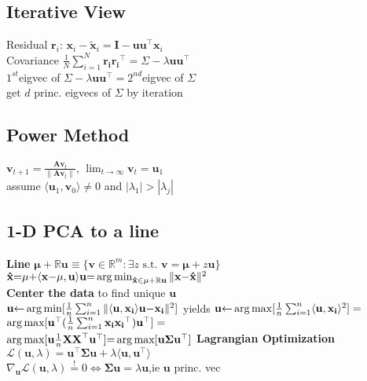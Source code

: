 \subsection*{Iterative View}
Residual $\mathbf{r}_i$: $\mathbf{x}_i{-}\tilde{\mathbf{x}}_i{=}\mathbf{I}{-}\mathbf{uu}^\top \mathbf{x}_i$\\
Covariance  $\frac{1}{N} \sum_{i=1}^N \mathbf{r_i}\mathbf{r_i}^\top{=}\Sigma{-} \lambda \mathbf{uu}^\top$ \\
$1^{st}$eigvec of $\Sigma{-}\lambda \mathbf{u u}^\top{=}2^{nd}$eigvec of $\Sigma$\\
get $d$ princ. eigvecs of $\Sigma$ by iteration
\subsection*{Power Method}
$\mathbf{v}_{t+1}{=}\frac{\mathbf{Av}_t}{\|\mathbf{Av}_t\|}$, $\lim_{t\rightarrow\infty}\mathbf{v}_t=\mathbf{u}_1$\\
assume $\langle\mathbf{u}_1,\mathbf{v}_0\rangle\neq0$ and $|\lambda_1|>|\lambda_j|$
\subsection*{1-D PCA to a line}
\textbf{Line} 
$\mathbf{\mu}{+}\mathbb{R}\mathbf{u}{\equiv}\{\mathbf{v}{\in}\mathbb{R}^m{:}\exists z \text{ s.t. }\mathbf{v}=\mathbf{\mu}+z\mathbf{u}\}$
$\mathbf{\hat{x}}{=}\mathbf{\mu}{+}\langle\mathbf{x}{-}\mathbf{\mu},\mathbf{u}\rangle\mathbf{u}{=}\operatorname*{arg\,min}_{\mathbf{\hat{x}}{\in}\mathbf{\mu}{+}\mathbb{R}\mathbf{u}}\|\mathbf{x}{-}\mathbf{\hat{x}}\|^2$\\
\textbf{Center the data} to find unique $\mathbf{u}$\\
$\mathbf{u}{\leftarrow}\operatorname*{arg\,min}[\frac{1}{n}\sum_{i=1}^n\|\langle\mathbf{u}, \mathbf{x_i}\rangle\mathbf{u}{-}\mathbf{x_i}\|^2]$
yields $\mathbf{u}{\leftarrow}\operatorname*{arg\,max}[\frac{1}{n}\sum_{i=1}^n\langle\mathbf{u},\mathbf{x_i}\rangle^2]=$\\
$\operatorname*{arg\,max}[\mathbf{u}^\top(\frac{1}{n}\sum_{i=1}^n\mathbf{x_ix_i}^\top)\mathbf{u}^\top]=$\\
$\operatorname*{arg\,max}[\mathbf{u}\frac{1}{n}\mathbf{XX}^\top\mathbf{u}^\top] {=} \operatorname*{arg\,max}[\mathbf{u}\mathbf{\Sigma}\mathbf{u}^\top]$
\textbf{Lagrangian Optimization}\\
$\mathcal{L}(\mathbf{u},\lambda){=}\mathbf{u}^\top\mathbf{\Sigma}\mathbf{u}{+}\lambda\langle\mathbf{u},\mathbf{u}^\top\rangle$\\
$\nabla_{\mathbf{u}}\mathcal{L}(\mathbf{u},\lambda){\stackrel{!}{=}}0{\Leftrightarrow}\mathbf{\Sigma u}{=}\lambda\mathbf{u}$,ie $\mathbf{u}$ princ. vec




